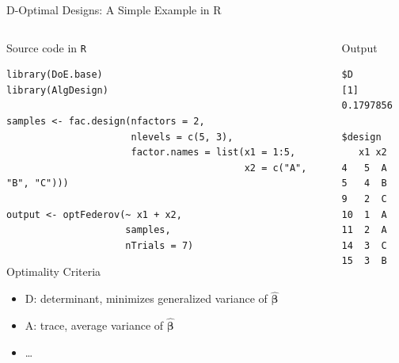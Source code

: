 \documentclass[10pt, compress, aspectratio=169, xcolor={table,usenames,dvipsnames}]{beamer}
\begin{document}
\begin{frame}[label={sec:org818c9c1},fragile]{D-Optimal Designs: A Simple Example in R}
 \begin{columns}
\begin{column}{0.7\columnwidth}
\begin{block}{Source code in \texttt{R}}
\vspace{-.2cm}

\lstset{language=r,label= ,caption= ,captionpos=b,numbers=none}
\begin{lstlisting}
library(DoE.base)
library(AlgDesign)

samples <- fac.design(nfactors = 2,
                      nlevels = c(5, 3),
                      factor.names = list(x1 = 1:5,
                                          x2 = c("A", "B", "C")))

output <- optFederov(~ x1 + x2,
                     samples,
                     nTrials = 7)
\end{lstlisting}

\begin{block}{Optimality Criteria}
\begin{itemize}
\item \alert{D}: \alert{determinant}, minimizes generalized variance of \(\bm{\hat{\beta}}\)
\item \alert{A}: \alert{trace}, average variance of \(\bm{\hat{\beta}}\)
\item \dots{}
\end{itemize}
\end{block}
\end{block}
\end{column}


\begin{column}{0.3\columnwidth}
\begin{block}{Output}
\vspace{-.2cm}
\scriptsize

\begin{verbatim}
$D
[1] 0.1797856

$design
   x1 x2
4   5  A
5   4  B
9   2  C
10  1  A
11  2  A
14  3  C
15  3  B
\end{verbatim}


\normalsize
\end{block}
\end{column}
\end{columns}
\end{frame}
\end{document}
